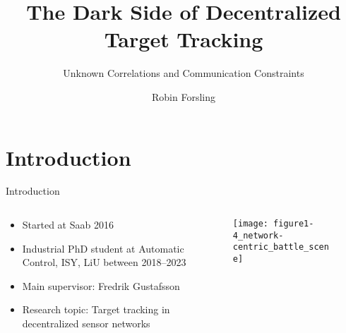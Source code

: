 \documentclass[aspectratio=1610]{beamer}
\title[Decentralized Target Tracking]{\Large The Dark Side of Decentralized Target Tracking}
\subtitle{\normalsize Unknown Correlations and Communication Constraints} %
\author{Robin Forsling}
\institute[]{%
}
\date[]{%
}
\begin{document}
\thispagestyle{empty}
\begin{frame}
    \titlepage
\end{frame}



\addtocounter{framenumber}{-1}





\section{Introduction}


\begin{frame}{Introduction}

\begin{columns}

\begin{column}{.5\textwidth}
    \begin{itemize}
        \item Started at Saab 2016
        \item Industrial PhD student at Automatic Control, ISY, LiU between 2018--2023
        \item Main supervisor: Fredrik Gustafsson
        \item Research topic: Target tracking in decentralized sensor networks
    \end{itemize}
\end{column}

\begin{column}{.5\textwidth}

    \begin{figure}
        \centering
        \texttt{[image: figure1-4\_network-centric\_battle\_scene]}
    \end{figure}

\end{column}

\end{columns}

\end{frame}
\end{document}
